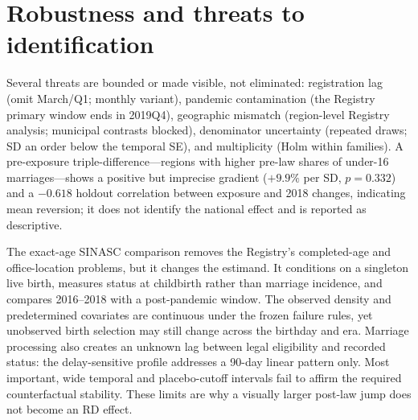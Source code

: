 \documentclass[12pt]{article}
\begin{document}
\section{Robustness and threats to identification}\label{sec:robust}

Several threats are bounded or made visible, not eliminated: registration lag (omit
March/Q1; monthly variant), pandemic contamination (the Registry primary window ends in
2019Q4), geographic mismatch (region-level Registry analysis; municipal contrasts
blocked), denominator uncertainty (repeated draws; SD an order below the temporal SE),
and multiplicity (Holm within families). A pre-exposure triple-difference---regions with
higher pre-law shares of under-16 marriages---shows a positive but imprecise gradient
($+9.9\%$ per SD, $p=0.332$) and a $-0.618$ holdout correlation between exposure and
2018 changes, indicating mean reversion; it does not identify the national effect and is
reported as descriptive.

The exact-age SINASC comparison removes the Registry's completed-age and office-location
problems, but it changes the estimand. It conditions on a singleton live birth, measures
status at childbirth rather than marriage incidence, and compares 2016--2018 with a
post-pandemic window. The observed density and predetermined covariates are continuous
under the frozen failure rules, yet unobserved birth selection may still change across
the birthday and era. Marriage processing also creates an unknown lag between legal
eligibility and recorded status: the delay-sensitive profile addresses a 90-day linear
pattern only. Most important, wide temporal and placebo-cutoff intervals fail to affirm
the required counterfactual stability. These limits are why a visually larger post-law
jump does not become an RD effect.
\end{document}
